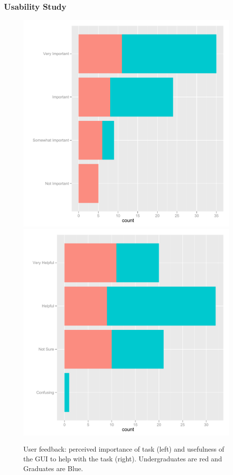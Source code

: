\documentclass[xcolor=dvipsnames]{beamer}
\begin{document}
\begin{frame}
  \frametitle{Usability Study}
\begin{figure}[htbp] %
   \centering
   \includegraphics[width=.5\linewidth, keepaspectratio=true]{fb-importance.pdf} 
   \includegraphics[width=.5\linewidth, keepaspectratio=true]{fb-useful.pdf} 
   \caption{User feedback: perceived importance of task (left) and usefulness of the GUI to help with the task (right). Undergraduates are red and Graduates are Blue.}
   \label{fb-use-importance}
\end{figure}
\end{frame}
\end{document}
